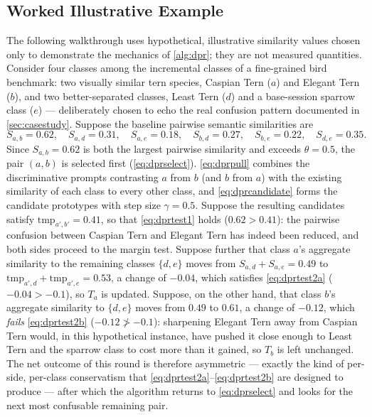 \documentclass{iutbscthesis}
\begin{document}
\subsection{Worked Illustrative Example}
\label{sec:dprexample}

The following walkthrough uses hypothetical, illustrative similarity values chosen only to demonstrate the mechanics of \autoref{alg:dpr}; they are not measured quantities. Consider four classes among the incremental classes of a fine-grained bird benchmark: two visually similar tern species, Caspian Tern ($a$) and Elegant Tern ($b$), and two better-separated classes, Least Tern ($d$) and a base-session sparrow class ($e$) --- deliberately chosen to echo the real confusion pattern documented in \autoref{sec:casestudy}. Suppose the baseline pairwise semantic similarities are
\[
S_{a,b} = 0.62, \quad S_{a,d} = 0.31, \quad S_{a,e} = 0.18, \quad S_{b,d} = 0.27, \quad S_{b,e} = 0.22, \quad S_{d,e} = 0.35 .
\]
Since $S_{a,b} = 0.62$ is both the largest pairwise similarity and exceeds $\theta = 0.5$, the pair $(a,b)$ is selected first (\autoref{eq:dprselect}). \autoref{eq:dprpull} combines the discriminative prompts contrasting $a$ from $b$ (and $b$ from $a$) with the existing similarity of each class to every other class, and \autoref{eq:dprcandidate} forms the candidate prototypes with step size $\gamma = 0.5$. Suppose the resulting candidates satisfy $\mathrm{tmp}_{a',b'} = 0.41$, so that \autoref{eq:dprtest1} holds ($0.62 > 0.41$): the pairwise confusion between Caspian Tern and Elegant Tern has indeed been reduced, and both sides proceed to the margin test. Suppose further that class $a$'s aggregate similarity to the remaining classes $\{d,e\}$ moves from $S_{a,d} + S_{a,e} = 0.49$ to $\mathrm{tmp}_{a',d} + \mathrm{tmp}_{a',e} = 0.53$, a change of $-0.04$, which satisfies \autoref{eq:dprtest2a} ($-0.04 > -0.1$), so $T_a$ is updated. Suppose, on the other hand, that class $b$'s aggregate similarity to $\{d,e\}$ moves from $0.49$ to $0.61$, a change of $-0.12$, which \emph{fails} \autoref{eq:dprtest2b} ($-0.12 \not> -0.1$): sharpening Elegant Tern away from Caspian Tern would, in this hypothetical instance, have pushed it close enough to Least Tern and the sparrow class to cost more than it gained, so $T_b$ is left unchanged. The net outcome of this round is therefore asymmetric --- exactly the kind of per-side, per-class conservatism that \autoref{eq:dprtest2a}--\autoref{eq:dprtest2b} are designed to produce --- after which the algorithm returns to \autoref{eq:dprselect} and looks for the next most confusable remaining pair.
\end{document}
